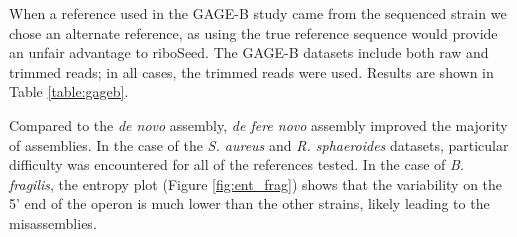 \documentclass[10pt]{article}
\begin{document}
\begin{linenumbers}
When a reference used in the GAGE-B study came from the sequenced strain we chose an alternate reference, as using the true reference sequence would provide an unfair advantage to riboSeed. The GAGE-B datasets include both raw and trimmed reads; in all cases, the trimmed reads were used. Results are shown in Table \ref{table:gageb}.

Compared to the \textit{de novo} assembly, \textit{de fere novo} assembly improved the majority of assemblies. In the case of the \textit{S. aureus} and \textit{R. sphaeroides} datasets, particular difficulty was encountered for all of the references tested. In the case of \textit{B. fragilis}, the entropy plot (Figure \ref{fig:ent_frag}) shows that the variability on the 5' end of the operon is much lower than the other strains, likely leading to the misassemblies.


\end{linenumbers}
\end{document}
